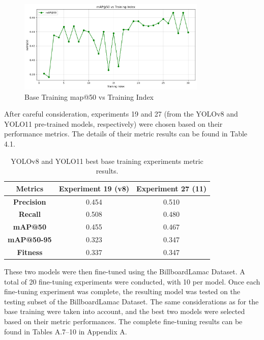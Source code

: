 \begin{figure}[h!]
    \centering
    \includegraphics[width=0.8\textwidth]{src/images/bt_map50.png}
    \caption{Base Training map@50 vs Training Index}
    \label{fig:bt3}
\end{figure}

After careful consideration, experiments 19 and 27 (from the YOLOv8 and YOLO11 pre-trained models, respectively) were chosen based on their performance metrics. The details of their metric results can be found in Table 4.1.\\

\begin{table}[h!]
\centering
\renewcommand{\arraystretch}{1.3} %
\begin{tabular}{|c|c|c|}
\hline
\textbf{Metrics} & \textbf{Experiment 19 (v8)} & \textbf{Experiment 27 (11)} \\ \hline
\textbf{Precision} & 0.454  & 0.510  \\ \hline
\textbf{Recall} & 0.508   & 0.480  \\ \hline
\textbf{mAP@50} & 0.455   & 0.467  \\ \hline
\textbf{mAP@50-95} & 0.323  & 0.347  \\ \hline
\textbf{Fitness} & 0.337 &	0.347 \\ \hline
\end{tabular}
\caption{YOLOv8 and YOLO11 best base training experiments metric results.}
\label{tab:bestbasemetrics}
\end{table}

These two models were then fine-tuned using the BillboardLamac Dataset. A total of 20 fine-tuning experiments were conducted, with 10 per model. Once each fine-tuning experiment was complete, the resulting model was tested on the testing subset of the BillboardLamac Dataset. The same considerations as for the base training were taken into account, and the best two models were selected based on their metric performances. The complete fine-tuning results can be found in Tables A.7–10 in Appendix A. \\

